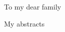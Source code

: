 \documentclass[12pt,a4paper,twoside]{Thesis} %
\theoremstyle{definition}
\begin{document}
\begin{center}
\large{To my dear family}
\end{center}
\vfill\vfill\null %
\cleardoublepage %

\pagestyle{fancy} %
\fancyhead{}   %
\fancyhead[LO]{\sl{\leftmark}}
\fancyhead[RE]{\sl{\rightmark}}
\fancyhead[LE,RO]{\thepage}





My abstracts




\pagestyle{fancy} %

\tableofcontents %

\listoffigures %

\listoftables %



%
%
\end{document}
